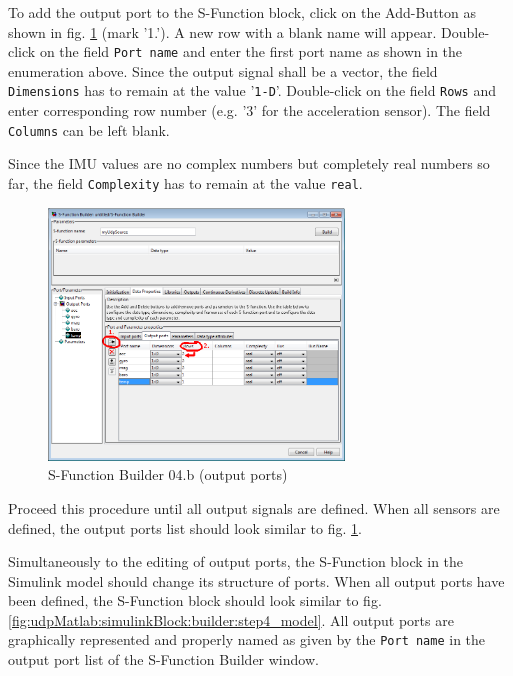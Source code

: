 To add the output port to the S-Function block, click on the Add-Button as shown in fig. \ref{fig:udpMatlab:simulinkBlock:builder:step4b} (mark '1.'). A new row with a blank name will appear. Double-click on the field \texttt{Port name} and enter the first port name as shown in the enumeration above. Since the output signal shall be a vector, the field \texttt{Dimensions} has to remain at the value '\texttt{1-D}'. Double-click on the field \texttt{Rows} and enter corresponding row number (e.g. '3' for the acceleration sensor). The field \texttt{Columns} can be left blank.

Since the IMU values are no complex numbers but completely real numbers so far, the field \texttt{Complexity} has to remain at the value \texttt{real}.

\begin{figure}[H]
    \centering
    \includegraphics[width=0.7\textwidth]{fig/ch-matlab-lib/sFuncBuilder_matlabBuilder_01}
    \caption{S-Function Builder 04.b (output ports)}
    \label{fig:udpMatlab:simulinkBlock:builder:step4b}
\end{figure}

Proceed this procedure until all output signals are defined. When all sensors are defined, the output ports list should look similar to fig. \ref{fig:udpMatlab:simulinkBlock:builder:step4b}.

Simultaneously to the editing of output ports, the S-Function block in the Simulink model should change its structure of ports. When all output ports have been defined, the S-Function block should look similar to fig. \ref{fig:udpMatlab:simulinkBlock:builder:step4_model}. All output ports are graphically represented and properly named as given by the \texttt{Port name} in the output port list of the S-Function Builder window.

